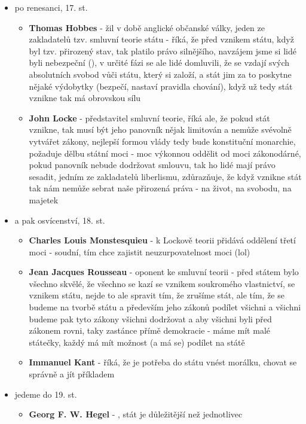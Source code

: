 \documentclass{article}
\begin{document}
\begin{itemize}
  \item po renesanci, 17. st.
  \begin{itemize}
    \item \textbf{Thomas Hobbes} - žil v době anglické občanské války, jeden ze zakladatelů tzv. smluvní teorie státu - říká, že před vznikem státu, když byl tzv. přirozený stav, tak platilo právo silnějšího, navzájem jsme si lidé byli nebezpeční (), v určité fázi se ale lidé domluvili, že se vzdají svých absolutních svobod vůči státu, který si založí, a stát jim za to poskytne nějaké výdobytky (bezpečí, nastaví pravidla chování), když už tedy stát vznikne tak má obrovskou sílu
    \item \textbf{John Locke} - představitel smluvní teorie, říká ale, že pokud stát vznikne, tak musí být jeho panovník nějak limitován a nemůže svévolně vytvářet zákony, nejlepší formou vlády tedy bude konstituční monarchie, požaduje dělbu státní moci - moc výkonnou oddělit od moci zákonodárné, pokud panovník nebude dodržovat smlouvu, tak ho lidé mají právo sesadit, jedním ze zakladatelů liberlismu, zdůrazňuje, že když vznikne stát tak nám nemůže sebrat naše přirozená práva - na život, na svobodu, na majetek
  \end{itemize}
  \item a pak osvícenství, 18. st.
  \begin{itemize}
    \item \textbf{Charles Louis Monstesquieu} - k Lockově teorii přidává oddělení třetí moci - soudní, tím chce zajistit neuzurpovatelnost moci (lol)
    \item \textbf{Jean Jacques Rousseau} - oponent ke smluvní teorii - před státem bylo všechno skvělé, že všechno se kazí se vznikem soukromého vlastnictví, se vznikem státu, nejde to ale spravit tím, že zrušíme stát, ale tím, že se budeme na tvorbě státu a především jeho zákonů podílet všichni a všichni budeme pak tyto zákony všichni dodržovat a aby všichni byli před zákonem rovni, taky zastánce přímě demokracie - máme mít malé státečky, každý má mít možnost (a má se) podílet na státě
    \item \textbf{Immanuel Kant} - říká, že je potřeba do státu vnést morálku, chovat se správně a jít příkladem
  \end{itemize}
  \item jedeme do 19. st.
  \begin{itemize}
    \item \textbf{Georg F. W. Hegel} - , stát je důležitější než jednotlivec

\end{itemize}
\end{itemize}
\end{document}
